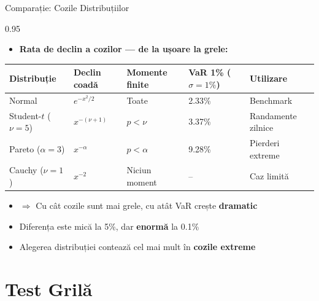 \documentclass[9pt, aspectratio=169, t]{beamer}
\begin{document}
\begin{frame}{Comparație: Cozile Distribuțiilor}
\begin{cminipage}{0.95\textwidth}
    \begin{itemize}\setlength{\itemsep}{0pt}
        \item \textbf{Rata de declin a cozilor --- de la ușoare la grele:}
    \end{itemize}

    \vspace{0.2cm}
    \small
    \renewcommand{\arraystretch}{1.3}
    \begin{tabular}{lllll}
    \toprule
    \textbf{Distribuție} & \textbf{Declin coadă} & \textbf{Momente finite} & \textbf{VaR 1\%} ($\sigma=1\%$) & \textbf{Utilizare} \\
    \midrule
    Normal & $e^{-x^2/2}$ & Toate & 2.33\% & Benchmark \\
    Student-$t$ ($\nu=5$) & $x^{-(\nu+1)}$ & $p < \nu$ & 3.37\% & Randamente zilnice \\
    Pareto ($\alpha=3$) & $x^{-\alpha}$ & $p < \alpha$ & 9.28\% & Pierderi extreme \\
    Cauchy ($\nu=1$) & $x^{-2}$ & Niciun moment & -- & Caz limită \\
    \bottomrule
    \end{tabular}
    \normalsize

    \vspace{0.3cm}
    \begin{itemize}\setlength{\itemsep}{0pt}
        \item $\Rightarrow$ Cu cât cozile sunt mai grele, cu atât VaR crește \textbf{dramatic}
        \item Diferența este mică la 5\%, dar \textbf{enormă} la 0.1\%
        \item Alegerea distribuției contează cel mai mult în \textbf{cozile extreme}
    \end{itemize}
\end{cminipage}
\end{frame}

\section{Test Grilă}
\end{document}
